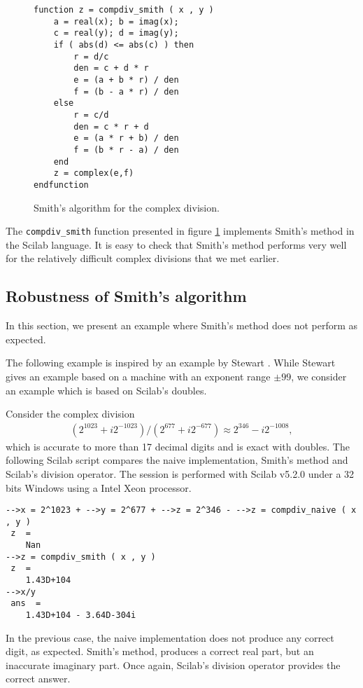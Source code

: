 \documentclass{paper}
\newcommand{\scifun}[1]{\texttt{#1}}
\begin{document}
\begin{figure}
\caption{Smith's algorithm for the complex division.}
\label{fig-compdiv-algosmith}
\lstset{language=scilabscript}
\begin{lstlisting}
function z = compdiv_smith ( x , y )
    a = real(x); b = imag(x);
    c = real(y); d = imag(y);
    if ( abs(d) <= abs(c) ) then
        r = d/c
        den = c + d * r
        e = (a + b * r) / den
        f = (b - a * r) / den
    else
        r = c/d
        den = c * r + d
        e = (a * r + b) / den
        f = (b * r - a) / den
    end
    z = complex(e,f)
endfunction
\end{lstlisting}
\end{figure}

The \scifun{compdiv\_smith} function presented in figure \ref{fig-compdiv-algosmith} 
implements Smith's method in the Scilab language.
It is easy to check that Smith's method performs very well for the relatively 
difficult complex divisions that we met earlier. 

\subsection{Robustness of Smith's algorithm}
\label{section-smithrobust}

In this section, we present an example where Smith's method does not perform as 
expected.

The following example is inspired by an example by Stewart \cite{214414}. 
While Stewart gives an example based on a machine with an exponent range 
$\pm 99$, we consider an example which is based on Scilab's doubles. 

Consider the complex division
\begin{eqnarray}
\label{eq-smithdiffcase0}
(2^{1023} +  i 2^{-1023})/(2^{677} +   i 2^{-677})
\approx 2^{346} -  i 2^{-1008},
\end{eqnarray}
which is accurate to more than 17 decimal digits and is exact with 
doubles. 
The following Scilab script compares the naive implementation, Smith's method
and Scilab's division operator.
The session is performed with Scilab v5.2.0 under a 32 bits Windows
using a Intel Xeon processor.
\lstset{language=scilabscript}
\begin{lstlisting}
-->x = 2^1023 + -->y = 2^677 + -->z = 2^346 - -->z = compdiv_naive ( x , y )
 z  =
    Nan 
-->z = compdiv_smith ( x , y )
 z  =
    1.43D+104 
-->x/y
 ans  =
    1.43D+104 - 3.64D-304i
\end{lstlisting}
In the previous case, the naive implementation does not produce any correct digit, as 
expected. 
Smith's method, produces a correct real part, but an inaccurate imaginary 
part. 
Once again, Scilab's division operator provides the correct answer.
\end{document}
